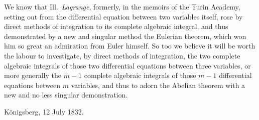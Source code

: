 \documentclass{article}
\begin{document}
We know that Ill.\ \emph{Lagrange}, formerly, in the memoirs of the Turin Academy, setting out from the differential equation between two variables itself, rose by direct methods of integration to its complete algebraic integral, and thus demonstrated by a new and singular method the Eulerian theorem, which won him so great an admiration from Euler himself. So too we believe it will be worth the labour to investigate, by direct methods of integration, the two complete algebraic integrals of those two differential equations between three variables, or more generally the $m-1$ complete algebraic integrals of those $m-1$ differential equations between $m$ variables, and thus to adorn the Abelian theorem with a new and no less singular demonstration.

Königsberg, 12 July 1832.
\end{document}
